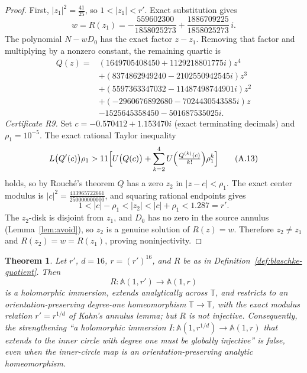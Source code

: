 \documentclass[11pt,reqno]{amsart}
\newtheorem{theorem}{Theorem}[section]
\theoremstyle{definition}
\theoremstyle{remark}
\begin{document}
\begin{proof}
First, \(|z_1|^2=\tfrac{41}{25}\), so \(1<|z_1|<r'\). Exact substitution gives
\[ w=R(z_1)=-\frac{559602300}{1858025273}+\frac{1886709225}{1858025273}\,i. \tag{A.11} \]
The polynomial \(N-wD_0\) has the exact factor \(z-z_1\). Removing that factor and multiplying by a nonzero constant, the remaining quartic is
\[\begin{aligned} Q(z)={}&(1649705408450+1129218801775i)z^{4}\\ &+(8374862949240-2102550942545i)z^{3}\\ &+(5597363347032-11487498744901i)z^{2}\\ &+(-2960676892680-7024430543585i)z\\ &-1525645358450-501687535025i. \end{aligned}\tag{A.12}\]
\emph{Certificate R9.} Set \(c=-0.570412+1.153470i\) (exact terminating decimals) and \(\rho_1=10^{-5}\). The exact rational Taylor inequality
\[ L\bigl(Q'(c)\bigr)\rho_1>11\Bigl[U\bigl(Q(c)\bigr)+\sum_{k=2}^{4}U\Bigl(\tfrac{Q^{(k)}(c)}{k!}\Bigr)\rho_1^{k}\Bigr] \tag{A.13} \]
holds, so by Rouch\'e's theorem \(Q\) has a zero \(z_2\) in \(|z-c|<\rho_1\).
The exact center modulus is \(|c|^2=\tfrac{413965722661}{250000000000}\), and squaring rational endpoints gives
\[ 1<|c|-\rho_1<|z_2|<|c|+\rho_1<1.287=r'. \]
The \(z_2\)-disk is disjoint from \(z_1\), and \(D_0\) has no zero in the source annulus (Lemma~\ref{lem:avoid}), so \(z_2\) is a genuine solution of \(R(z)=w\). Therefore \(z_2\ne z_1\) and \(R(z_2)=w=R(z_1)\), proving noninjectivity.
\end{proof}
\begin{theorem}\label{thm:annulus-nogo}
Let \(r'\), \(d=16\), \(r=(r')^{16}\), and \(R\) be as in Definition~\ref{def:blaschke-quotient}. Then
\[ R:\mathbb A(1,r')\longrightarrow\mathbb A(1,r) \]
is a holomorphic immersion, extends analytically across \(\mathbb T\), and restricts to an orientation-preserving degree-one homeomorphism \(\mathbb T\to\mathbb T\), with the exact modulus relation \(r'=r^{1/d}\) of Kahn's annulus lemma; but \(R\) is not injective. Consequently, the strengthening ``a holomorphic immersion \(I:\mathbb A(1,r^{1/d})\to\mathbb A(1,r)\) that extends to the inner circle with degree one must be globally injective'' is false, even when the inner-circle map is an orientation-preserving analytic homeomorphism.
\end{theorem}
\end{document}
